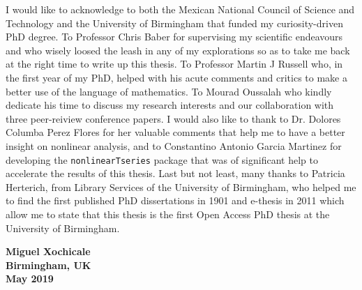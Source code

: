 
\begin{acknowledgements}      
I would like to acknowledge to both
the Mexican National Council of Science and Technology and 
the University of Birmingham 
that funded my curiosity-driven PhD degree.
To Professor Chris Baber for supervising my scientific endeavours
and who wisely loosed the leash in any of my explorations 
so as to take me back at the right time to write up this thesis.
To Professor Martin J Russell who, in the first year 
of my PhD, helped with his acute comments and critics to make a
better use of the language of mathematics.
To Mourad Oussalah who kindly dedicate his time to discuss 
my research interests and our collaboration with 
three peer-reiview conference papers.
I would also like to thank to Dr. Dolores Columba Perez Flores for
her valuable comments that help me to have a better insight on
nonlinear analysis, and to Constantino Antonio Garcia Martinez 
for developing the \texttt{nonlinearTseries} \R package that was of 
significant help to accelerate the results of this thesis.
Last but not least, many thanks to Patricia Herterich, 
from Library Services of the University of Birmingham, 
who helped me to find the first published PhD dissertations 
in 1901 and e-thesis in 2011 which allow me to 
state that this thesis is the first Open Access
PhD thesis at the University of Birmingham.

\begin{flushright}
\textbf{Miguel Xochicale}\\
\textbf{Birmingham, UK}\\
\textbf{May 2019}
\end{flushright}

\end{acknowledgements}
